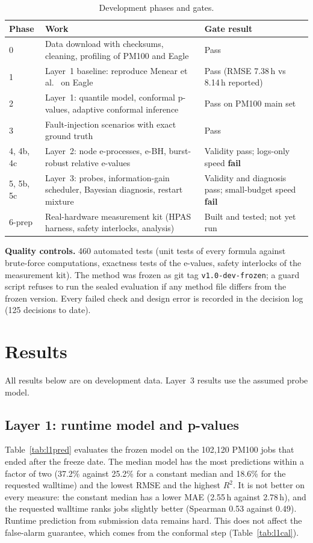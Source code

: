 \documentclass[10pt,a4paper]{article}
\begin{document}
\begin{table}[H]
\centering
\caption{Development phases and gates.}
\label{tab:phases}
\small
\begin{tabularx}{\textwidth}{@{}lXl@{}}
\toprule
Phase & Work & Gate result \\
\midrule
0 & Data download with checksums, cleaning, profiling of PM100 and Eagle & Pass\\
1 & Layer~1 baseline: reproduce Menear et al.~\cite{menear} on Eagle & Pass (RMSE 7.38\,h vs 8.14\,h reported)\\
2 & Layer~1: quantile model, conformal p-values, adaptive conformal inference & Pass on PM100 main set\\
3 & Fault-injection scenarios with exact ground truth & Pass\\
4, 4b, 4c & Layer~2: node e-processes, e-BH, burst-robust relative e-values & Validity pass; logs-only speed \textbf{fail}\\
5, 5b, 5c & Layer~3: probes, information-gain scheduler, Bayesian diagnosis, restart mixture & Validity and diagnosis pass; small-budget speed \textbf{fail}\\
6-prep & Real-hardware measurement kit (HPAS harness, safety interlocks, analysis) & Built and tested; not yet run\\
\bottomrule
\end{tabularx}
\end{table}

\textbf{Quality controls.} 460 automated tests (unit tests of every formula against brute-force computations, exactness tests of the e-values, safety interlocks of the measurement kit). The method was frozen as git tag \texttt{v1.0-dev-frozen}; a guard script refuses to run the sealed evaluation if any method file differs from the frozen version. Every failed check and design error is recorded in the decision log (125 decisions to date).

\section{Results}
All results below are on development data. Layer~3 results use the assumed probe model.

\subsection{Layer 1: runtime model and p-values}
Table~\ref{tab:l1pred} evaluates the frozen model on the 102{,}120 PM100 jobs that ended after the freeze date. The median model has the most predictions within a factor of two (37.2\% against 25.2\% for a constant median and 18.6\% for the requested walltime) and the lowest RMSE and the highest $R^2$. It is not better on every measure: the constant median has a lower MAE (2.55\,h against 2.78\,h), and the requested walltime ranks jobs slightly better (Spearman 0.53 against 0.49). Runtime prediction from submission data remains hard. This does not affect the false-alarm guarantee, which comes from the conformal step (Table~\ref{tab:l1cal}).
\end{document}
